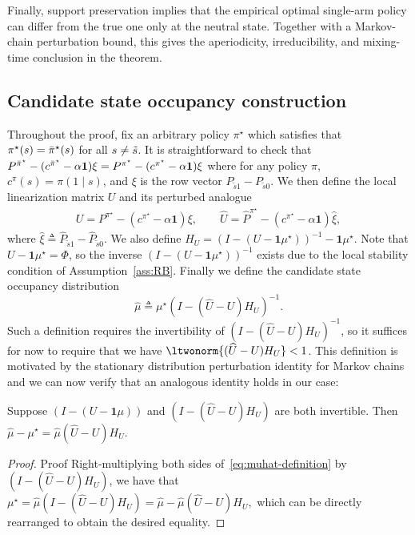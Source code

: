 \documentclass[mnsc,nonblindrev]{informs3}
\newcommand{\Phat}{\widehat{P}}
\newcommand{\one}{\mathbf{1}}
\newcommand{\pistar}{\pi^\star}
\newcommand{\pibst}{\Bar{\pi}^\star}
\newcommand{\muhat}{\widehat{\mu}}
\newcommand{\uhat}{\widehat{U}}
\newcommand{\xihat}{\widehat{\xi}}
\begin{document}
Finally, support preservation implies that the empirical optimal
single-arm policy can differ from the true one only at the neutral state.
Together with a Markov-chain perturbation bound, this gives the
aperiodicity, irreducibility, and mixing-time conclusion in the theorem.
\subsection{Candidate state occupancy construction}
\label{sec:pert_subsec_1}
Throughout the proof, fix an arbitrary policy $\pistar$ which satisfies that $ \pistar(s)=\pibst(s)$ for all $ s \neq \Tilde{s}$. It is straightforward to check that
$
    P^{\pibst} - (c^{\pibst} -\alpha \one)\xi = P^{\pistar} - (c^{\pistar} -\alpha \one)\xi
$
where for any policy $\pi$, $c^{\pi}(s) = \pi(1 \mid s)$, and $\xi$ is the row vector $P_{\tilde{s}1}-P_{\tilde{s}0}$. We then define the local linearization matrix $U$ and its perturbed analogue
\begin{align*}
    U = P^{\pistar} - (c^{\pistar} -\alpha \one)\xi, 
    \qquad
    \uhat = \Phat^{\pistar} - (c^{\pistar} -\alpha \one)\widehat \xi,
\end{align*}
where $\xihat \triangleq \Phat_{\tilde{s}1}-\Phat_{\tilde{s}0}$. We also define $H_U = (I - (U - \one \mu^\star))^{-1} - \one \mu^\star.$ 
Note that $U-\one \mu^\star=\Phi$, so the inverse $(I - (U - \one \mu^\star))^{-1}$ exists due to the local stability condition of Assumption~\ref{ass:RB}.
Finally we define the candidate state occupancy distribution
\begin{equation}
    \muhat\triangleq \mu^\star (I - (\uhat-U)H_U)^{-1}.
    \label{eq:muhat-definition}
\end{equation} 
Such a definition requires the invertibility of $(I - (\uhat-U)H_U)^{-1}$, so it suffices for now to require that we have $\ltwonorm{(\uhat-U)H_U}< 1$.
This definition is motivated by the stationary distribution perturbation identity for Markov chains \citep{meyer_jr_role_1975} and we can now verify that an analogous identity holds in our case:
\begin{lemma}
    \label{lem:pert_analysis_sim_lemma}
    Suppose $(I - (U - \one \mu))$ and $(I - (\uhat-U)H_U)$ are both invertible. Then
    $
        \muhat - \mu^\star = \muhat (\uhat - U)H_U.
    $
\end{lemma}
\begin{proof}{Proof}
    Right-multiplying both sides of~\eqref{eq:muhat-definition} by $(I - (\uhat-U)H_U)$, we have that
    $
        \mu^\star = \muhat (I - (\uhat-U)H_U) = \muhat - \muhat (\uhat - U)H_U,
    $
    which can be directly rearranged to obtain the desired equality.
\end{proof}
\end{document}
